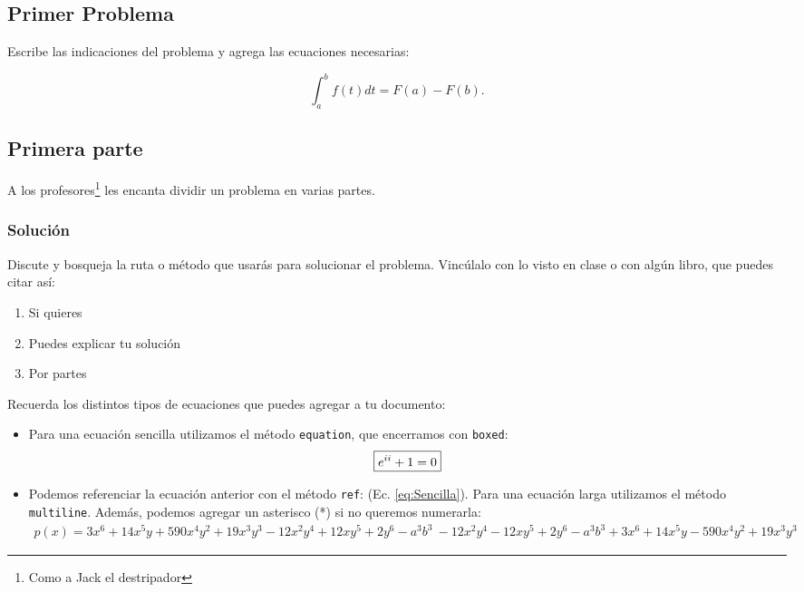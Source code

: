 \documentclass{assignment}
\date{\today}                                   %
\begin{document}
\begin{problem}

\section{Primer Problema}

\noindent Escribe las indicaciones del problema y agrega las ecuaciones necesarias:

\begin{equation}\label{eq:TeoremaFundamental}
    \int_a^b f(t)dt = F(a)-F(b).
\end{equation}

\subsection{Primera parte}

\noindent A los profesores\footnote{Como a Jack el destripador} les encanta dividir un problema en varias partes.

\subsubsection*{Solución}

\noindent Discute y bosqueja la ruta o método que usarás para solucionar el problema. Vincúlalo con lo visto en clase o con algún libro, que puedes citar así: \cite{GustavoLopez}

\begin{enumerate}
    \item Si quieres
    \item Puedes explicar tu solución
    \item Por partes
\end{enumerate}

\noindent Recuerda los distintos tipos de ecuaciones que puedes agregar a tu documento:

\begin{itemize}
    \item Para una ecuación sencilla utilizamos el método \texttt{equation}, que encerramos con \texttt{boxed}:
    \begin{equation}\label{eq:Sencilla}
        \boxed{             %
        e^{i i} + 1 = 0
        }
    \end{equation}

    \item Podemos referenciar la ecuación anterior con el método \texttt{ref}: (Ec. \ref{eq:Sencilla}). Para una ecuación larga utilizamos el método \texttt{multiline}. Además, podemos agregar un asterisco (*) si no queremos numerarla:
    \begin{multline*}
        p(x) = 3x^6 + 14x^5y + 590x^4y^2 + 19x^3y^3 - 12x^2y^4 + 12xy^5 + 2y^6 - a^3b^3\
            - 12x^2y^4 - 12xy^5 + 2y^6 - a^3b^3 + 3x^6 + 14x^5y - 590x^4y^2 + 19x^3y^3
    \end{multline*}


\end{itemize}
\end{problem}
\end{document}
